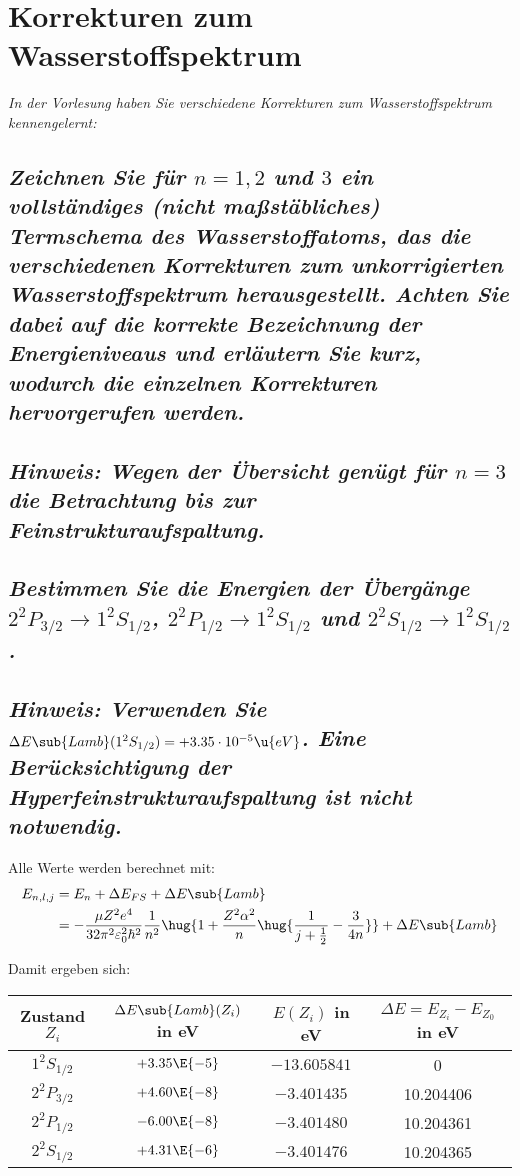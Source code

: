 \documentclass[ex, minted]{exercise_4.0}
\begin{document}
\section{Korrekturen zum Wasserstoffspektrum}
{\it In der Vorlesung haben Sie verschiedene Korrekturen zum Wasserstoffspektrum kennengelernt:}

\subsection{\it Zeichnen Sie für \(n=1,2\) und \(3\) ein vollständiges (nicht maßstäbliches) Termschema des  Wasserstoffatoms, das die verschiedenen Korrekturen zum unkorrigierten Wasserstoffspektrum herausgestellt. Achten Sie dabei auf die korrekte Bezeichnung der Energieniveaus und erläutern Sie kurz, wodurch die einzelnen Korrekturen hervorgerufen werden.\\\\
Hinweis: Wegen der Übersicht genügt für \(n=3\) die Betrachtung bis zur Feinstrukturaufspaltung.}

\dottedlinett



\subsection{\it Bestimmen Sie die Energien der Übergänge 
\(2^2P_{3/2}\to 1^2S_{1/2}\), \(2^2P_{1/2}\to 1^2S_{1/2}\) und 
\(2^2S_{1/2}\to 1^2S_{1/2}\). \\\\
Hinweis: Verwenden Sie \(\Delta E\sub{Lamb}(1^2S_{1/2}) = +3.35\cdot 10^{-5}\u{eV}\). Eine Berücksichtigung der Hyperfeinstrukturaufspaltung ist nicht notwendig.}

\dottedlinett

Alle Werte werden berechnet mit:
\begin{align*}
    E_{n,l,j} &= E_n + \Delta E_{FS} + \Delta E\sub{Lamb} \\
    &= -\frac{\mu Z^2 e^4}{32 \pi^2 \varepsilon_0^2 \hbar^2} \frac{1}{n^2}  \hug{1+ \frac{Z^2\alpha^2}{n} \hug{\frac{1}{j+\frac12} - \frac{3}{4n}}} + \Delta E\sub{Lamb}
\end{align*}

Damit ergeben sich: 
\begin{center}
    \begin{tabular}{|c|c|c|c|}
        \hline 
        Zustand \(Z_i\)& \(\Delta E\sub{Lamb}(Z_i)\) in eV & \(E(Z_i)\) in eV& \(\Delta E = E_{Z_i} - E_{Z_0}\) in eV\\\hline
        \(1^2S_{1/2}\) & \(+3.35\E{-5}\) & \(-13.605841\) & 0 \\
        \(2^2P_{3/2}\) & \(+4.60\E{-8}\) & \( -3.401435\) & 10.204406 \\
        \(2^2P_{1/2}\) & \( -6.00\E{-8}\) & \(-3.401480\) & 10.204361 \\
        \(2^2S_{1/2}\) & \(+4.31\E{-6}\) & \(-3.401476\) & 10.204365 \\\hline
    \end{tabular}    
\end{center}
\end{document}
